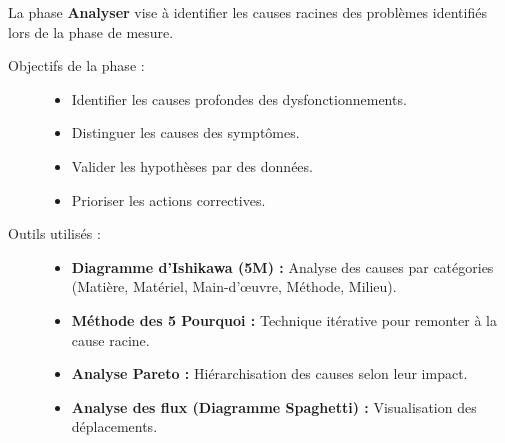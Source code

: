 \documentclass[a4paper,12pt]{article}
\begin{document}
La phase \textbf{Analyser} vise à identifier les causes racines des problèmes identifiés lors de la phase de mesure.

\begin{description}
    \item[Objectifs de la phase :]
    \begin{itemize}
        \item Identifier les causes profondes des dysfonctionnements.
        \item Distinguer les causes des symptômes.
        \item Valider les hypothèses par des données.
        \item Prioriser les actions correctives.
    \end{itemize}
    
    \item[Outils utilisés :]
    \begin{itemize}
        \item \textbf{Diagramme d'Ishikawa (5M) :} Analyse des causes par catégories (Matière, Matériel, Main-d'œuvre, Méthode, Milieu).
        \item \textbf{Méthode des 5 Pourquoi :} Technique itérative pour remonter à la cause racine.
        \item \textbf{Analyse Pareto :} Hiérarchisation des causes selon leur impact.
        \item \textbf{Analyse des flux (Diagramme Spaghetti) :} Visualisation des déplacements.
    \end{itemize}
\end{description}

\begin{center}
\end{center}
\end{document}
